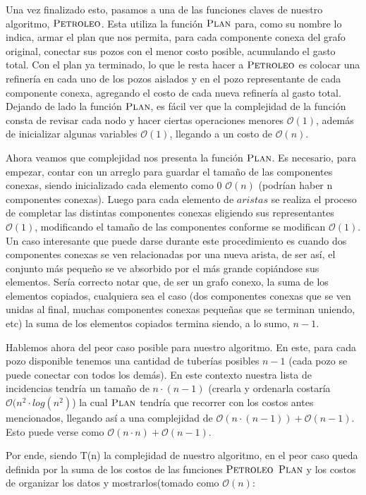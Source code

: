 Una vez finalizado esto, pasamos a una de las funciones claves de nuestro algoritmo, $\textnormal{\scshape Petroleo}$. Esta utiliza la función $\textnormal{\scshape Plan}$ para, como su nombre lo indica, armar el plan que nos permita, para cada componente conexa del grafo original, conectar sus pozos con el menor costo posible, acumulando el gasto total. Con el plan ya terminado, lo que le resta hacer a $\textnormal{\scshape Petroleo}$ es colocar una refinería en cada uno de los pozos aislados y en el pozo representante de cada componente conexa, agregando el costo de cada nueva refinería al gasto total. Dejando de lado la función $\textnormal{\scshape Plan}$, es fácil ver que la complejidad de la función consta de revisar cada nodo y hacer ciertas operaciones menores $\mathcal{O}(1)$, además de inicializar algunas variables $\mathcal{O}(1)$, llegando a un costo de $\mathcal{O}(n)$.

Ahora veamos que complejidad nos presenta la función $\textnormal{\scshape Plan}$. Es necesario, para empezar, contar con un arreglo para guardar el tamaño de las componentes conexas, siendo inicializado cada elemento como 0 $\mathcal{O}(n)$ (podrían haber n componentes conexas). Luego para cada elemento de $aristas$ se realiza el proceso de completar las distintas componentes conexas eligiendo sus representantes $\mathcal{O}(1)$, modificando el tamaño de las componentes conforme se modifican $\mathcal{O}(1)$. Un caso interesante que puede darse durante este procedimiento es cuando dos componentes conexas se ven relacionadas por una nueva arista, de ser así, el conjunto más pequeño se ve absorbido por el más grande copiándose sus elementos. Sería correcto notar que, de ser un grafo conexo, la suma de los elementos copiados, cualquiera sea el caso (dos componentes conexas que se ven unidas al final, muchas componentes conexas pequeñas que se terminan uniendo, etc) la suma de los elementos copiados termina siendo, a lo sumo, $n-1$.

Hablemos ahora del peor caso posible para nuestro algoritmo. En este, para cada pozo disponible tenemos una cantidad de tuberías posibles $n-1$ (cada pozo se puede conectar con todos los demás). En este contexto nuestra lista de incidencias tendría un tamaño de $n \cdot (n-1)$ (crearla y ordenarla costaría $\mathcal{O}(n^2 \cdot log(n^2)$) la cual $\textnormal{\scshape Plan}$ tendría que recorrer con los costos antes mencionados, llegando así a una complejidad de $\mathcal{O}(n \cdot (n-1)) + \mathcal{O}(n-1)$. Esto puede verse como $\mathcal{O}(n \cdot n) + \mathcal{O}(n-1)$.

Por ende, siendo T(n) la complejidad de nuestro algoritmo, en el peor caso queda definida por la suma de los costos de las funciones $\textnormal{\scshape Petroleo}$ $\textnormal{\scshape Plan}$ y los costos de organizar los datos y mostrarlos(tomado como $\mathcal{O}(n)$:

